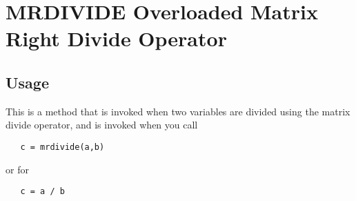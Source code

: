 \section{MRDIVIDE Overloaded Matrix Right Divide Operator}

\subsection{Usage}

This is a method that is invoked when two variables are divided
using the matrix divide operator, and is invoked when you call
\begin{verbatim}
   c = mrdivide(a,b)
\end{verbatim}
or for
\begin{verbatim}
   c = a / b
\end{verbatim}
